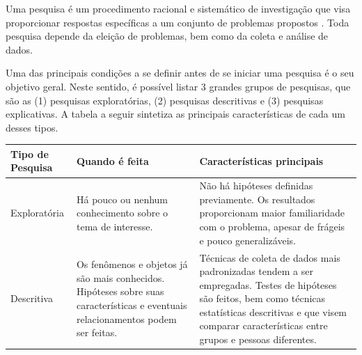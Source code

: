 \documentclass[
]{book}
\begin{document}
Uma pesquisa é um procedimento racional e sistemático de investigação que visa proporcionar respostas específicas a um conjunto de problemas propostos \citep{gil2002}. Toda pesquisa depende da eleição de problemas, bem como da coleta e análise de dados.

Uma das principais condições a se definir antes de se iniciar uma pesquisa é o seu objetivo geral. Neste sentido, é possível listar 3 grandes grupos de pesquisas, que são as (1) pesquisas exploratórias, (2) pesquisas descritivas e (3) pesquisas explicativas. A tabela a seguir sintetiza as principais características de cada um desses tipos.

\begin{longtable}[]{@{}lll@{}}
\toprule
\begin{minipage}[b]{0.30\columnwidth}\raggedright
Tipo de Pesquisa\strut
\end{minipage} & \begin{minipage}[b]{0.30\columnwidth}\raggedright
Quando é feita\strut
\end{minipage} & \begin{minipage}[b]{0.30\columnwidth}\raggedright
Características principais\strut
\end{minipage}\tabularnewline
\midrule
\endhead
\begin{minipage}[t]{0.30\columnwidth}\raggedright
Exploratória\strut
\end{minipage} & \begin{minipage}[t]{0.30\columnwidth}\raggedright
Há pouco ou nenhum conhecimento sobre o tema de interesse.\strut
\end{minipage} & \begin{minipage}[t]{0.30\columnwidth}\raggedright
Não há hipóteses definidas previamente. Os resultados proporcionam maior familiaridade com o problema, apesar de frágeis e pouco generalizáveis.\strut
\end{minipage}\tabularnewline
\begin{minipage}[t]{0.30\columnwidth}\raggedright
Descritiva\strut
\end{minipage} & \begin{minipage}[t]{0.30\columnwidth}\raggedright
Os fenômenos e objetos já são mais conhecidos. Hipóteses sobre suas características e eventuais relacionamentos podem ser feitas.\strut
\end{minipage} & \begin{minipage}[t]{0.30\columnwidth}\raggedright
Técnicas de coleta de dados mais padronizadas tendem a ser empregadas. Testes de hipóteses são feitos, bem como técnicas estatísticas descritivas e que visem comparar características entre grupos e pessoas diferentes.\strut

\end{minipage}
\end{longtable}
\end{document}
